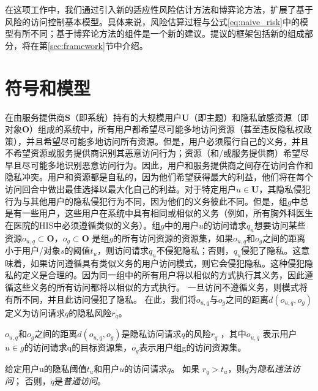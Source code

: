 在这项工作中，我们通过引入新的适应性风险估计方法和博弈论方法，扩展了基于风险的访问控制基本模型。具体来说，风险估算过程与公式\ref{eq:naive_risk}中的模型有所不同；基于博弈论方法的组件是一个新的建议。提议的框架包括新的组成部分，将在第\ref{sec:framework}节中介绍。


\section{符号和模型}
\label{sec:notations}


在由服务提供商$\mathbf{S}$（即系统）持有的大规模用户$\mathbf{U}$（即主题）和隐私敏感资源（即对象$\mathbf{O}$）组成的系统中，所有用户都希望尽可能多地访问资源（甚至违反隐私权政策），并且希望尽可能多地访问所有资源。但是，用户必须履行自己的义务，并且不希望资源或服务提供商识别其恶意访问行为；资源（和/或服务提供商）希望尽早且尽可能多地识别恶意访问行为。因此，用户和服务提供商之间存在访问合作和隐私冲突。用户和资源都是自私的，因为他们希望获得最大的利益，他们将在每个访问回合中做出最佳选择以最大化自己的利益。对于特定用户$u \in \mathbf{U}$，其隐私侵犯行为与其他用户的隐私侵犯行为不同，因为他们的义务彼此不同。但是，组$g$中总是有一些用户，这些用户在系统中具有相同或相似的义务（例如，所有胸外科医生在医院的HIS中必须遵循类似的义务）。组$g$中的用户$u$的访问请求$q_u$想要访问某些资源$o_{u,q} \subset \mathbf{O}$，$o_{g} \subset \mathbf{O}$ 是组$g$的所有访问资源的资源集，如果$o_{u,q}$和$o_{g}$之间的距离小于用户/对象$s$的阈值$t_u$，则访问请求$q_u$不侵犯隐私；否则，$q_u$侵犯了隐私。这意味着，如果访问遵循具有类似义务的用户访问模式，则它会侵犯隐私。这种侵犯隐私的定义是合理的。因为同一组中的所有用户将以相似的方式执行其义务，因此遵循这些义务的所有访问都将以相似的方式执行。 一旦访问不遵循义务，则模式将有所不同，并且此访问侵犯了隐私。 在此，我们将$o_{u,q}$与$o_{g}$之间的距离$d(o_{u,q},o_{g})$定义为访问请求$q$的隐私风险$r_q$。
\begin{definition}
	\label{def:privacy_risk}
	$o_{u,q}$和$o_{g}$之间的距离$d(o_{u,q},o_{g})$是隐私访问请求$q$的风险$r_q$ ，其中$o_{u,q}$ 表示用户$u \in g$的访问请求q的目标资源集，$o_{g}$表示用户组g的访问资源集。
\end{definition}

\begin{definition}
	\label{def:privacy_violation_access}
	
	给定用户u的隐私阈值$t_u$和用户$u$的访问请求$q$。 如果 $r_q > t_u$，则$q$为\textit{隐私违法访问}； 否则，$q$是\textit{普通访问}。
\end{definition}



